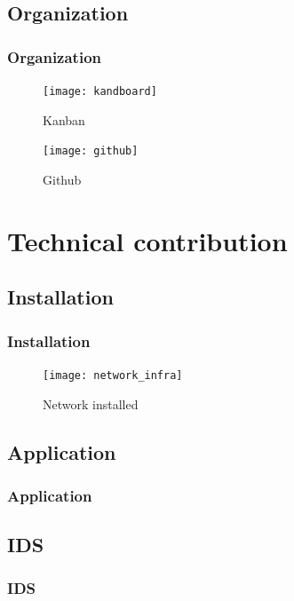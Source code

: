 \documentclass[10pt, svgnames, compress, red]{beamer}
\begin{document}
\subsection{Organization}
\begin{frame}
  \frametitle{Organization}
  \begin{minipage}[h]{0.45\linewidth}
    \begin{figure}[h]
      \centering
      \texttt{[image: kandboard]}
      \caption{Kanban}
    \end{figure}
  \end{minipage}\hfill
  \begin{minipage}[h]{0.45\linewidth}
    \begin{figure}[h]
      \centering
      \texttt{[image: github]}
      \caption{Github}
    \end{figure}
  \end{minipage}
\end{frame}

\section{Technical contribution}

\subsection{Installation}
\begin{frame}
  \frametitle{Installation}
  \begin{figure}[h]
    \centering
    \texttt{[image: network\_infra]}
    \caption{Network installed}
  \end{figure}
\end{frame}

\subsection{Application}
\begin{frame}
  \frametitle{Application}

\end{frame}

\subsection{IDS}
\begin{frame}
  \frametitle{IDS}

\end{frame}
\end{document}
